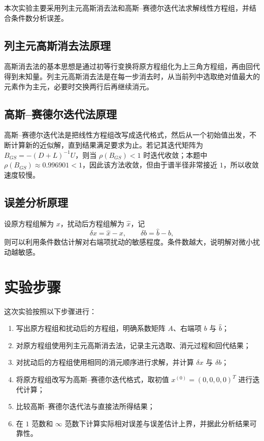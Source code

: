 \documentclass[12pt,a4paper]{ctexart}
\begin{document}
本次实验主要采用列主元高斯消去法和高斯--赛德尔迭代法求解线性方程组，并结合条件数分析误差。

\subsection{列主元高斯消去法原理}

高斯消去法的基本思想是通过初等行变换将原方程组化为上三角方程组，再由回代得到未知量。列主元高斯消去法是在每一步消去时，从当前列中选取绝对值最大的元素作为主元，必要时交换两行后再继续消元。

\subsection{高斯--赛德尔迭代法原理}

高斯--赛德尔迭代法是把线性方程组改写成迭代格式，然后从一个初始值出发，不断计算新的近似解，直到结果满足要求为止。若记其迭代矩阵为 $B_{GS}=-(D+L)^{-1}U$，则当 $\rho(B_{GS})<1$ 时迭代收敛；本题中 $\rho(B_{GS})\approx 0.996901<1$，因此该方法收敛，但由于谱半径非常接近 $1$，所以收敛速度较慢。

\subsection{误差分析原理}

设原方程组解为 $x$，扰动后方程组解为 $\hat{x}$，记
\[
\delta x=\hat{x}-x,\qquad \delta b=\hat{b}-b,
\]
则可以利用条件数估计解对右端项扰动的敏感程度。条件数越大，说明解对微小扰动越敏感。

\section{实验步骤}

这次实验按照以下步骤进行：
\begin{enumerate}
    \item 写出原方程组和扰动后的方程组，明确系数矩阵 $A$、右端项 $b$ 与 $\hat{b}$；
    \item 对原方程组使用列主元高斯消去法，记录主元选取、消元过程和回代结果；
    \item 对扰动后的方程组使用相同的消元顺序进行求解，并计算 $\delta x$ 与 $\delta b$；
    \item 将原方程组改写为高斯--赛德尔迭代格式，取初值 $x^{(0)}=(0,0,0,0)^T$ 进行迭代计算；
    \item 比较高斯--赛德尔迭代法与直接法所得结果；
    \item 在 $1$ 范数和 $\infty$ 范数下计算实际相对误差与误差估计上界，并据此分析结果可靠性。
\end{enumerate}
\end{document}
